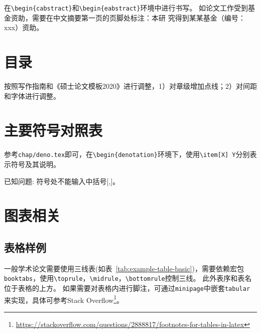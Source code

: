 在\verb|\begin{cabstract}|和\verb|\begin{eabstract}|环境中进行书写。
如论文工作受到基金资助，需要在中文摘要第一页的页脚处标注：本研 究得到某某基金（编号：xxx）资助。

\section{目录}
\label{sec:directory}

按照写作指南和《硕士论文模板2020》进行调整，1）对章级增加点线；2）对间距和字体进行调整。

\section{主要符号对照表}
\label{sec:denotation}

参考\verb|chap/deno.tex|即可，在\verb|\begin{denotation}|环境下，使用\verb|\item[X] Y|分别表示符号及其说明。

已知问题: 符号处不能输入中括号$[$,$]$。

\section{图表相关}
\label{sec:table-figure}

\subsection{表格样例}
\label{sec:table-example}

一般学术论文需要使用三线表(如表~\ref{tab:example-table-basic})，需要依赖宏包\verb|booktabs|，使用\verb|\toprule|，\verb|\midrule|，\verb|\bottomrule|控制三线。
此外表序和表名位于表格的上方。
如果需要对表格内进行脚注，可通过\texttt{minipage}中嵌套\texttt{tabular}来实现，具体可参考Stack Overflow\footnote{\url{https://stackoverflow.com/questions/2888817/footnotes-for-tables-in-latex}}。

